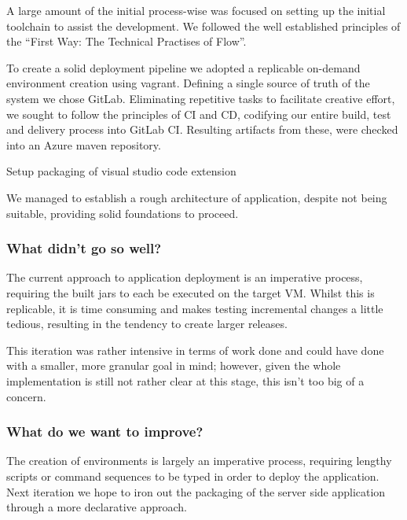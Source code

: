 A large amount of the initial process-wise was focused on setting up the initial toolchain to assist the development. We followed the well established principles of the ``First Way: The Technical Practises of Flow''.


To create a solid deployment pipeline we adopted a replicable on-demand environment creation using vagrant. Defining a single source of truth of the system we chose GitLab. Eliminating repetitive tasks to facilitate creative effort, we sought to follow the principles of CI and CD, codifying our entire build, test and delivery process into GitLab CI. Resulting artifacts from these, were checked into an Azure maven repository.

Setup packaging of visual studio code extension

We managed to establish a rough architecture of application, despite not being suitable, providing solid foundations to proceed.

\subsubsection{What didn't go so well?}

The current approach to application deployment is an imperative process, requiring the built jars to each be executed on the target VM. Whilst this is replicable, it is time consuming and makes testing incremental changes a little tedious, resulting in the tendency to create larger releases.

This iteration was rather intensive in terms of work done and could have done with a smaller, more granular goal in mind; however, given the whole implementation is still not rather clear at this stage, this isn't too big of a concern.

\subsubsection{What do we want to improve?}

The creation of environments is largely an imperative process, requiring lengthy scripts or command sequences to be typed in order to deploy the application. Next iteration we hope to iron out the packaging of the server side application through a more declarative approach. 